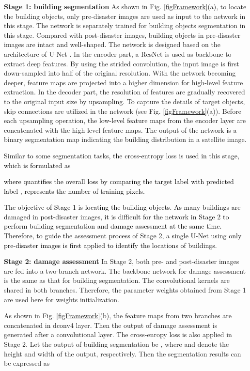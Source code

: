 \documentclass[journal]{IEEEtran}
\begin{document}
\textbf{Stage 1: building segmentation} As shown in Fig. \ref{figFramework}(a), to locate the building objects, only pre-disaster images are used as input to the network in this stage. The network is separately trained for building objects segmentation in this stage. Compared with post-disaster images, building objects in pre-disaster images are intact and well-shaped. The network is designed based on the architecture of U-Net \cite{UNet}. In the encoder part, a ResNet \cite{he2016deep} is used as backbone to extract deep features. 
By using the strided convolution, the input image is first down-sampled into half of the original resolution. With the network becoming deeper, feature maps are projected into a higher dimension for high-level feature extraction. In the decoder part, the resolution of features are gradually recovered to the original input size by upsampling. To capture the details of target objects, skip connections are utilized in the network (see Fig. \ref{figFramework}(a)). Before each upsampling operation, the low-level feature maps from the encoder layer are concatenated with the high-level feature maps. The output of the network is a binary segmentation map indicating the building distribution in a satellite image. \textcolor{black}{Similar to some segmentation tasks, the cross-entropy loss is used in this stage, which is formulated as  

where  quantifies the overall loss by comparing the target label  with predicted label ,  represents the number of training pixels.}

\textcolor{black}{The objective of Stage 1 is locating the building objects. 
As many buildings are damaged in post-disaster images, it is difficult for the network in Stage 2 to perform building segmentation and damage assessment at the same time. 
 Therefore, to guide the assessment process of Stage 2, a single U-Net using only pre-disaster images is first applied to identify the locations of  buildings. }

\textbf{Stage 2: damage assessment} In Stage 2, both pre- and post-disaster images are fed into a two-branch network.
The backbone network for damage assessment is the same as that for building segmentation. The convolutional kernels are shared in both branches. Therefore, the parameter weights obtained from Stage 1 are used here for weights initialization.  

As shown in Fig. \ref{figFramework}(b), the feature maps from two branches are concatenated in dconv4 layer. Then the output of damage assessment is generated after a convolutional layer. The cross-enropy loss is also applied in Stage 2.
Let the output of building segmentation be , where  and  denote the height and width of the output, respectively.
Then the segmentation results can be expressed as
\end{document}
